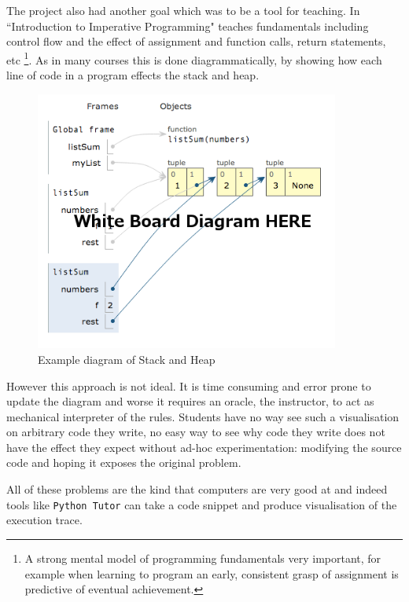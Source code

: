 \documentclass[11pt, a4paper]{article}
\newcommand{\cmd}[1]{{\tt #1}}
\begin{document}
The project also had another goal which was to be a tool for teaching.
In ``Introduction to Imperative Programming" teaches fundamentals including control flow and the effect of assignment and function calls, return statements, etc
\footnote{A strong mental model of programming fundamentals very important, for example when learning to program an early, consistent grasp of assignment is predictive of eventual achievement\cite{saeed09}.}.
As in many courses this is done diagrammatically, by showing how each line of code in a program effects the stack and heap.

\begin{figure}[h!]
\centering
\includegraphics[width=100mm]{whiteboard.png}
\caption{Example diagram of Stack and Heap}
\end{figure}

However this approach is not ideal.
It is time consuming and error prone to update the diagram and worse it requires an oracle, the instructor, to act as mechanical interpreter of the rules.
Students have no way see such a visualisation on arbitrary code they write, no easy way to see why code they write does not have the effect they expect without ad-hoc experimentation: modifying the source code and hoping it exposes the original problem.

All of these problems are the kind that computers are very good at and indeed tools like \cmd{Python Tutor}\cite{pythontutor} can take a code snippet and produce visualisation of the execution trace. 
\end{document}
